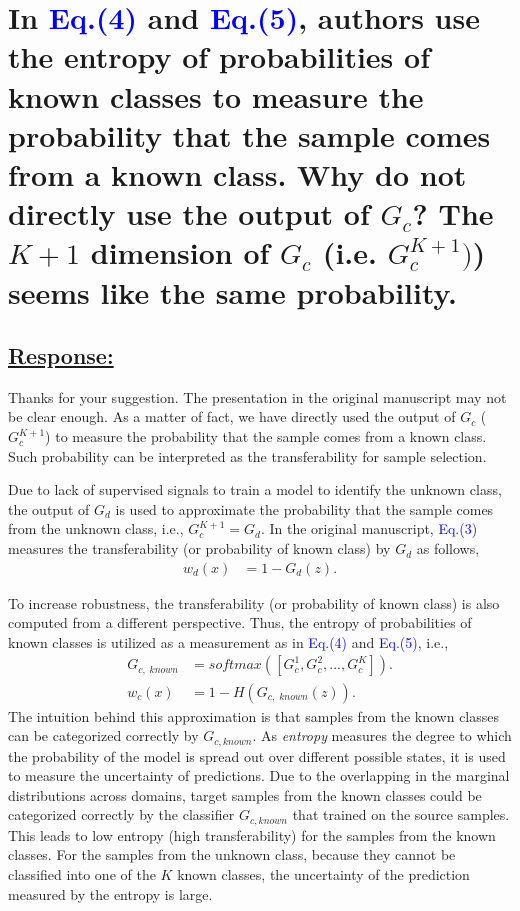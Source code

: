 \section{In \textcolor{blue}{Eq.(4)} and \textcolor{blue}{Eq.(5)}, authors use the entropy of probabilities of known classes to measure the probability that the sample comes from a known class. Why do not directly use the output of $G_c$? The $K+1$ dimension of $G_c$  (i.e. $G_c^{K+1})$) seems like the same probability. }

\subsection*{\underline{\textbf{Response:}}}

Thanks for your suggestion. 
The presentation in the original manuscript may not be clear enough. 
As a matter of fact, we have directly used the output of $G_c$ ($G_c^{K+1}$) to measure the probability that the sample comes from a known class. 
Such probability can be interpreted as the transferability for sample selection.

Due to lack of supervised signals to train a model to identify the unknown class, the output of $G_d$ is used to approximate the probability that the sample comes from the unknown class, i.e., $G_c^{K+1} = G_d$.
In the original manuscript, \textcolor{blue}{Eq.(3)} measures the transferability (or probability of known class) by $G_d$ as follows,
\begin{align}
    w_d(x) &= 1-G_d(z). \label{eq: domain transferability}
\end{align}

To increase robustness, the transferability (or probability of known class) is also computed from a different perspective. 
Thus, the entropy of probabilities of known classes is utilized as a measurement as in \textcolor{blue}{Eq.(4)} and \textcolor{blue}{Eq.(5)}, i.e.,
\begin{align}
    G_{c,\; known} &= softmax([G_c^1,G_c^2,...,G_c^K]).\\
    w_c(x) &= 1-H(G_{c,\; known}(z)). \label{eq: class transferability}
\end{align}
The intuition behind this approximation is that samples from the known classes can be categorized correctly by $G_{c, known}$.
As \textit{entropy} measures the degree to which the probability of the model is spread out over different possible states, it is used to measure the uncertainty of predictions.
Due to the overlapping in the marginal distributions across domains, target samples from the known classes could be categorized correctly by the classifier $G_{c, known}$ that trained on the source samples. 
This leads to low entropy (high transferability) for the samples from the known classes.
For the samples from the unknown class, because they cannot be classified into one of the $K$ known classes, the uncertainty of the prediction measured by the entropy is large.

